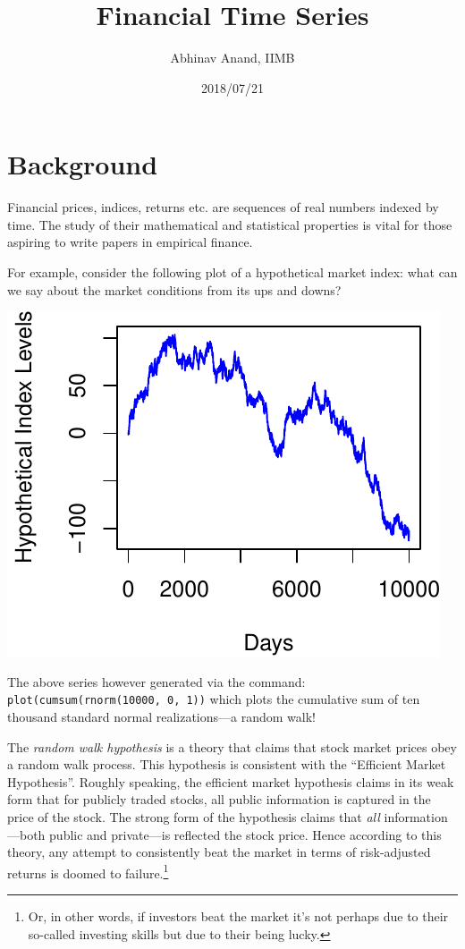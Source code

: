\documentclass[11pt,]{article}
\title{Financial Time Series}
\author{Abhinav Anand, IIMB}
\date{2018/07/21}
\let\rmarkdownfootnote\footnote%
\def\footnote{\protect\rmarkdownfootnote}
\begin{document}
\maketitle

\section{Background}\label{background}

Financial prices, indices, returns etc. are sequences of real numbers
indexed by time. The study of their mathematical and statistical
properties is vital for those aspiring to write papers in empirical
finance.

For example, consider the following plot of a hypothetical market index:
what can we say about the market conditions from its ups and downs?

\begin{center}\includegraphics{FMC_T4_PhD_Fin_Time_Series_files/figure-latex/hypo_market_index-1} \end{center}

The above series however generated via the command:
\texttt{plot(cumsum(rnorm(10000,\ 0,\ 1))} which plots the cumulative
sum of ten thousand standard normal realizations---a random walk!

The \emph{random walk hypothesis} is a theory that claims that stock
market prices obey a random walk process. This hypothesis is consistent
with the ``Efficient Market Hypothesis''. Roughly speaking, the
efficient market hypothesis claims in its weak form that for publicly
traded stocks, all public information is captured in the price of the
stock. The strong form of the hypothesis claims that \emph{all}
information---both public and private---is reflected the stock price.
Hence according to this theory, any attempt to consistently beat the
market in terms of risk-adjusted returns is doomed to failure.\footnote{Or,
  in other words, if investors beat the market it's not perhaps due to
  their so-called investing skills but due to their being lucky.}
\end{document}
